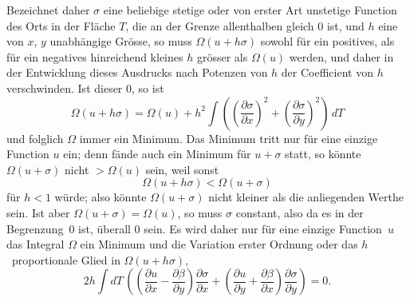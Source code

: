 \documentclass[a4paper,12pt,leqno]{article}
\begin{document}
Bezeichnet daher $\sigma$ eine beliebige stetige oder von erster
Art unstetige Function des Orts in der Fl\"{a}che $T$, die an der
Grenze allenthalben gleich $0$ ist, und $h$ eine von $x$, $y$
unabh\"{a}ngige Gr\"{o}sse, so muss $\Omega( u + h \sigma)$
sowohl f\"{u}r ein positives, als f\"{u}r ein negatives
hinreichend kleines $h$ gr\"{o}sser als $\Omega(u)$ werden, und
daher in der Entwicklung dieses Ausdrucks nach Potenzen von $h$
der Coefficient von $h$ verschwinden.  Ist dieser $0$, so ist
\[ \Omega (u + h \sigma)
   = \Omega(u) + h^2 \int
         \left(
            \left( \frac{\partial \sigma}{\partial x} \right)^2
          + \left( \frac{\partial \sigma}{\partial y} \right)^2
         \right) \, dT \]
und folglich $\Omega$ immer ein Minimum.  Das Minimum tritt nur f\"{u}r
eine einzige Function $u$ ein; denn f\"{a}nde auch ein Minimum
f\"{u}r $u + \sigma$ statt, so k\"{o}nnte $\Omega( u + \sigma)$
nicht $> \Omega(u)$ sein, weil sonst
\[ \Omega(u + h \sigma) < \Omega (u + \sigma) \]
f\"{u}r $h < 1$ w\"{u}rde; also k\"{o}nnte $\Omega(u + \sigma)$
nicht kleiner als die anliegenden Werthe sein.  Ist aber
$\Omega(u + \sigma) = \Omega(u)$, so muss $\sigma$ constant, also
da es in der Begrenzung~$0$ ist, \"{u}berall $0$ sein.  Es wird
daher nur f\"{u}r eine einzige Function~$u$ das Integral $\Omega$
ein Minimum und die Variation erster Ordnung oder das
$h$~proportionale Glied in $\Omega(u + h \sigma)$,
\[ 2 h \int dT \,
         \left(
            \left(
               \frac{\partial u}{\partial x}
             - \frac{\partial \beta}{\partial y}
            \right)
            \frac{\partial \sigma}{\partial x}
          + \left(
               \frac{\partial u}{\partial y}
             + \frac{\partial \beta}{\partial x}
            \right)
            \frac{\partial \sigma}{\partial y}
         \right)
   = 0.\]
\end{document}
